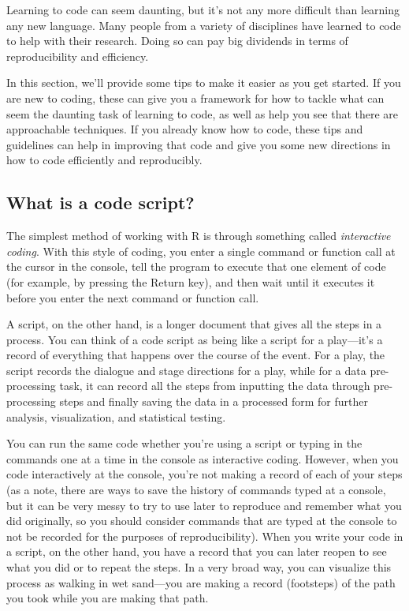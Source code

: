 \documentclass[]{tufte-book}
\begin{document}
Learning to code can seem daunting, but it's not any more difficult than
learning any new language. Many people from a variety of disciplines have
learned to code to help with their research. Doing so can pay big dividends in
terms of reproducibility and efficiency.

In this section, we'll provide some tips to make it easier as you get started.
If you are new to coding, these can give you a framework for how to tackle what
can seem the daunting task of learning to code, as well as help you see that
there are approachable techniques. If you already know how to code, these tips
and guidelines can help in improving that code and give you some new directions
in how to code efficiently and reproducibly.

\subsection{What is a code script?}\label{what-is-a-code-script}

The simplest method of working with R is through something called \emph{interactive
coding}. With this style of coding, you enter a single command or function call
at the cursor in the console, tell the program to execute that one element of
code (for example, by pressing the Return key), and then wait until it executes
it before you enter the next command or function call.

A script, on the other hand, is a longer document that gives all the steps in a
process. You can think of a code script as being like a script for a play---it's
a record of everything that happens over the course of the event. For a play,
the script records the dialogue and stage directions for a play, while for a
data pre-processing task, it can record all the steps from inputting the data
through pre-processing steps and finally saving the data in a processed form for
further analysis, visualization, and statistical testing.

You can run the same code whether you're using a script or typing in the
commands one at a time in the console as interactive coding. However, when you
code interactively at the console, you're not making a record of each of your
steps (as a note, there are ways to save the history of commands typed at a
console, but it can be very messy to try to use later to reproduce and remember
what you did originally, so you should consider commands that are typed at the
console to not be recorded for the purposes of reproducibility). When you write
your code in a script, on the other hand, you have a record that you can
later reopen to see what you did or to repeat the steps. In a very broad way,
you can visualize this process as walking in wet sand---you are making a record
(footsteps) of the path you took while you are making that path.
\end{document}

